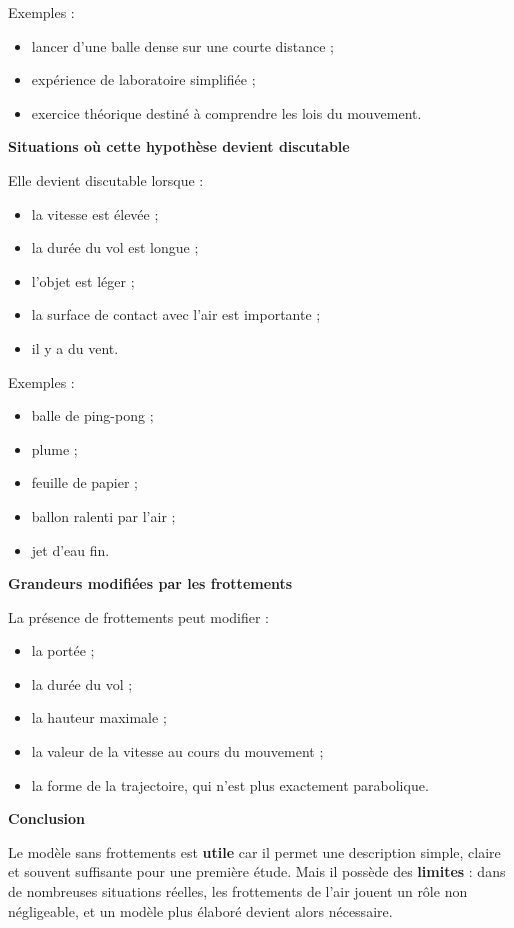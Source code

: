 \documentclass[11pt,a4paper]{article}
\begin{document}
Exemples :
\begin{itemize}
    \item lancer d'une balle dense sur une courte distance ;
    \item expérience de laboratoire simplifiée ;
    \item exercice théorique destiné à comprendre les lois du mouvement.
\end{itemize}

\medskip

\textbf{Situations où cette hypothèse devient discutable}

Elle devient discutable lorsque :
\begin{itemize}
    \item la vitesse est élevée ;
    \item la durée du vol est longue ;
    \item l'objet est léger ;
    \item la surface de contact avec l'air est importante ;
    \item il y a du vent.
\end{itemize}

Exemples :
\begin{itemize}
    \item balle de ping-pong ;
    \item plume ;
    \item feuille de papier ;
    \item ballon ralenti par l'air ;
    \item jet d'eau fin.
\end{itemize}

\medskip

\textbf{Grandeurs modifiées par les frottements}

La présence de frottements peut modifier :
\begin{itemize}
    \item la portée ;
    \item la durée du vol ;
    \item la hauteur maximale ;
    \item la valeur de la vitesse au cours du mouvement ;
    \item la forme de la trajectoire, qui n'est plus exactement parabolique.
\end{itemize}

\medskip

\textbf{Conclusion}

Le modèle sans frottements est \textbf{utile} car il permet une description simple, claire et souvent suffisante pour une première étude. Mais il possède des \textbf{limites} : dans de nombreuses situations réelles, les frottements de l'air jouent un rôle non négligeable, et un modèle plus élaboré devient alors nécessaire.
\end{document}
